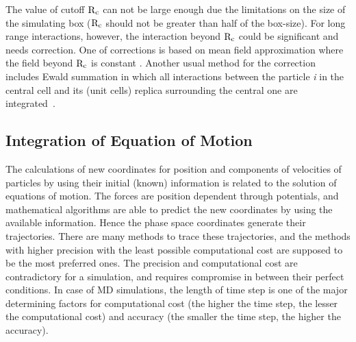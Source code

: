 The value of cutoff ${\rm R}_{\text{c}}$ can not be large enough due the limitations on the size of the simulating box 
(${\rm R}_{\text{c}}$ should not be greater than half of the box-size). For long range interactions, however, the interaction beyond ${\rm R}_{\text{c}}$ could be significant and needs correction. One of corrections is based on mean field approximation where the field beyond ${\rm R}_{\text{c}}$ is constant \citep{Thapa2013}. Another usual method for the correction includes Ewald summation in which all interactions between the particle {\it i} in the central cell and its (unit cells) replica surrounding the central one are integrated~\citep{Gromacs-manual}.
\subsection{Integration of Equation of Motion}
The calculations of new coordinates for position and components of velocities of particles by using their initial (known) information is related to the solution of equations of motion. The forces are position dependent through potentials, and mathematical algorithms are able to predict the new coordinates by using the available information. Hence the phase space coordinates generate their trajectories. There are many methods to trace these trajectories, and the methods with higher precision with the least possible computational cost are supposed to be the most preferred ones. The precision and computational cost are contradictory for a simulation, and requires compromise in between their perfect conditions\citep{Allen1989}. In case of MD simulations, the length of time step is one of the major determining factors for computational cost (the higher the time step, 
the lesser the computational cost) and accuracy (the smaller the time step, the higher the accuracy).
